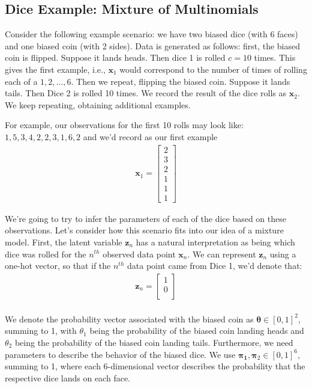     \subsection{Dice Example: Mixture of Multinomials}
    
    Consider the following example scenario: we have two biased dice (with 6 faces) and one biased coin (with 2 sides). Data is generated as follows: first, the biased coin is flipped. Suppose it lands heads. Then dice 1 is rolled $c=10$ times. This gives the first example, i.e., $\mathbf{x}_1$ would correspond to the number of times of rolling each of a $1, 2, \ldots, 6$. Then we repeat, flipping the biased coin. Suppose it lands tails. Then Dice 2 is rolled 10 times. We record the result of the dice rolls as $\mathbf{x}_2$. We keep repeating, obtaining additional examples. 

   For example, our observations for the first 10 rolls may look like: 
    $    1, 5, 3, 4, 2, 2, 3, 1, 6, 2$ and we'd record as our first example
\begin{align*}
    \textbf{x}_1 =
        \begin{bmatrix}
            2 \\
            3 \\
            2 \\
            1 \\
            1 \\
            1
        \end{bmatrix} 
\end{align*}


We're going to try to infer the parameters of each of the dice based on these observations.
%
Let's consider how this scenario fits into our idea of a mixture model. First, the latent variable $\textbf{z}_n$ has a natural interpretation as being which dice was rolled for the $n^{th}$ observed data point $\textbf{x}_n$. We can represent $\textbf{z}_n$ using a one-hot vector, so that if the $n^{th}$ data point came from Dice 1, we'd denote that:
\begin{align*}
    \textbf{z}_n =
        \begin{bmatrix}
            1 \\
            0 \\
        \end{bmatrix} \\
\end{align*}

We denote the probability vector associated with the biased coin as $\boldsymbol{\theta} \in [0,1]^{2}$, summing to 1, with $\theta_1$ being the probability of the biased coin landing heads and $\theta_2$ being the probability of the biased coin landing tails. Furthermore, we need parameters to describe the behavior of the biased dice. We use $\boldsymbol{\pi_1}, \boldsymbol{\pi}_2 \in [0,1]^{6}$, summing to 1, where each 6-dimensional vector describes the probability that the respective dice lands on each face.


